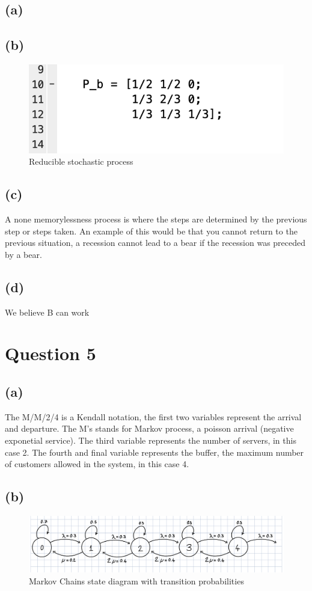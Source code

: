 \documentclass{article}
\begin{document}
\subsection{(a)}
\subsection{(b)}
\begin{figure}[H]
    \includegraphics[width=\linewidth]{./imgs/4b.png}
    \caption{Reducible stochastic process}
\end{figure}
\subsection{(c)}
A none memorylessness process is where the steps are determined by the previous step or steps taken. An example of this would be that you cannot return to the previous situation, a recession cannot lead to a bear if the recession was preceded by a bear.
\subsection{(d)}
We believe B can work





\section{Question 5}
\subsection{(a)}
The M/M/2/4 is a Kendall notation, the first two variables represent the arrival and departure. The M's stands for Markov process, a poisson arrival (negative exponetial service). The third variable represents the number of servers, in this case 2. The fourth and final variable represents the buffer, the maximum number of customers allowed in the system, in this case 4.

\subsection{(b)}
\begin{figure}[H]
    \includegraphics[width=\linewidth]{./imgs/5b.JPG}
    \caption{Markov Chains state diagram with transition probabilities}
\end{figure}
\end{document}
